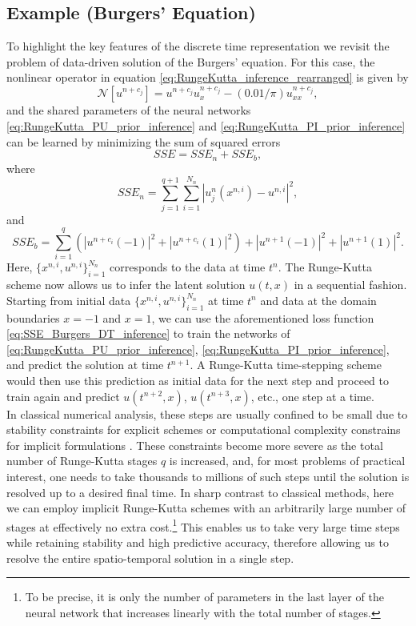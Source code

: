 \documentclass[preprint,12pt]{elsarticle}
\begin{document}
\subsection{Example (Burgers' Equation)}
To highlight the key features of the discrete time representation we revisit the problem of data-driven solution of the Burgers' equation. For this case, the nonlinear operator in equation \eqref{eq:RungeKutta_inference_rearranged} is given by
\[
\mathcal{N}[u^{n+c_j}] = u^{n+c_j} u^{n+c_j}_x - (0.01/\pi)u^{n+c_j}_{xx},
\]
and the shared parameters of the neural networks \eqref{eq:RungeKutta_PU_prior_inference} and \eqref{eq:RungeKutta_PI_prior_inference} can be learned by minimizing the sum of squared errors
\begin{equation}\label{eq:SSE_Burgers_DT_inference}
SSE = SSE_n + SSE_{b},
\end{equation}
where
\[
SSE_n = \sum_{j=1}^{q+1} \sum_{i=1}^{N_n} |u^n_j(x^{n,i}) - u^{n,i}|^2,
\]
and
\[
SSE_b = \sum_{i=1}^q \left(|u^{n+c_i}(-1)|^2 + |u^{n+c_i}(1)|^2\right) + |u^{n+1}(-1)|^2 + |u^{n+1}(1)|^2.
\]
Here, $\{x^{n,i}, u^{n,i}\}_{i=1}^{N_n}$ corresponds to the data at time $t^n$. The Runge-Kutta scheme now allows us to infer the latent solution $u(t,x)$ in a sequential fashion. Starting from initial data $\{x^{n,i}, u^{n,i}\}_{i=1}^{N_n}$ at time $t^n$ and data at the domain boundaries $x = -1$ and $x = 1$, we can use the aforementioned loss function \eqref{eq:SSE_Burgers_DT_inference} to train the networks of \eqref{eq:RungeKutta_PU_prior_inference}, \eqref{eq:RungeKutta_PI_prior_inference}, and predict the solution at time $t^{n+1}$. A Runge-Kutta time-stepping scheme would then use this prediction as initial data for the next step and proceed to train again and predict $u(t^{n+2},x)$, $u(t^{n+3},x)$, etc., one step at a time.\\

In classical numerical analysis, these steps are usually confined to be small due to stability constraints for explicit schemes or computational complexity constrains for implicit formulations \cite{iserles2009first}. These constraints become more severe as the total number of Runge-Kutta stages $q$ is increased, and, for most problems of practical interest, one needs to take thousands to millions of such steps until the solution is resolved up to a desired final time. In sharp contrast to classical methods, here we can employ implicit Runge-Kutta schemes with an arbitrarily large number of stages at effectively no extra cost.\footnote{To be precise, it is only the number of parameters in the last layer of the neural network that increases linearly with the total number of stages.} This enables us to take very large time steps while retaining stability and high predictive accuracy, therefore allowing us to resolve the entire spatio-temporal solution in a single step.\\
\end{document}
